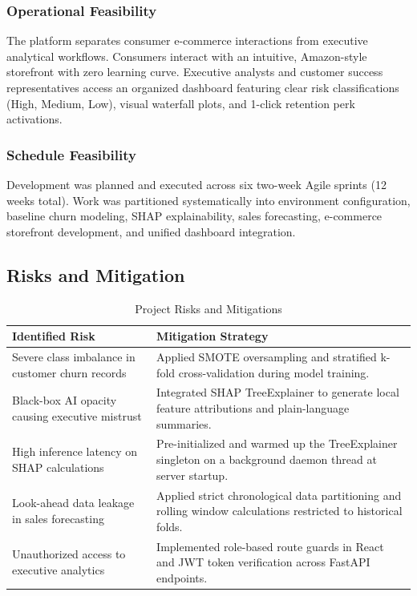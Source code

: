 \documentclass[12pt,a4paper]{article}
\begin{document}
\subsubsection{Operational Feasibility}
The platform separates consumer e-commerce interactions from executive analytical workflows. Consumers interact with an intuitive, Amazon-style storefront with zero learning curve. Executive analysts and customer success representatives access an organized dashboard featuring clear risk classifications (High, Medium, Low), visual waterfall plots, and 1-click retention perk activations.

\subsubsection{Schedule Feasibility}
Development was planned and executed across six two-week Agile sprints (12 weeks total). Work was partitioned systematically into environment configuration, baseline churn modeling, SHAP explainability, sales forecasting, e-commerce storefront development, and unified dashboard integration.

\subsection{Risks and Mitigation}\label{sub:2.4}

\begin{table}[H]
\centering
\small
\caption{Project Risks and Mitigations}
\begin{tabularx}{\linewidth}{|L{3.8cm}|Y|}
\hline
\textbf{Identified Risk} & \textbf{Mitigation Strategy} \\ \hline
Severe class imbalance in customer churn records & Applied SMOTE oversampling and stratified k-fold cross-validation during model training. \\ \hline
Black-box AI opacity causing executive mistrust & Integrated SHAP TreeExplainer to generate local feature attributions and plain-language summaries. \\ \hline
High inference latency on SHAP calculations & Pre-initialized and warmed up the TreeExplainer singleton on a background daemon thread at server startup. \\ \hline
Look-ahead data leakage in sales forecasting & Applied strict chronological data partitioning and rolling window calculations restricted to historical folds. \\ \hline
Unauthorized access to executive analytics & Implemented role-based route guards in React and JWT token verification across FastAPI endpoints. \\ \hline
\end{tabularx}
\label{tab:risks_mitigations}
\end{table}
\end{document}
